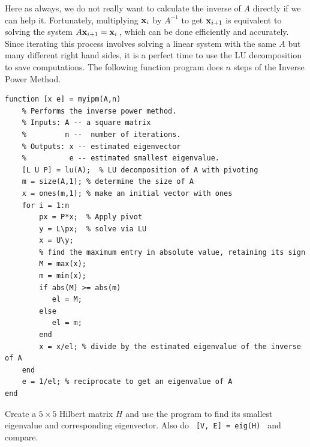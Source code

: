 Here as always, we do not really want to calculate the
inverse of $A$ directly if we can help it. Fortunately, multiplying
$\mathbf{x}_i$ by $A^{-1}$ to get $\mathbf{x}_{i+1}$ is equivalent to solving the system
$    A \mathbf{x}_{i+1} = \mathbf{x}_i\, $,
which can be done efficiently and accurately. Since iterating this process involves
solving a linear system with the same $A$ but many different right hand
sides, it is a perfect time to use the LU decomposition to save computations.
The following function program does $n$ steps of the Inverse Power Method.
\begin{lstlisting}
function [x e] = myipm(A,n)
    % Performs the inverse power method.
    % Inputs: A -- a square matrix   
    %         n --  number of iterations.
    % Outputs: x -- estimated eigenvector
    %          e -- estimated smallest eigenvalue. 
    [L U P] = lu(A);  % LU decomposition of A with pivoting
    m = size(A,1); % determine the size of A
    x = ones(m,1); % make an initial vector with ones
    for i = 1:n
        px = P*x;  % Apply pivot
        y = L\px;  % solve via LU
        x = U\y;
        % find the maximum entry in absolute value, retaining its sign
        M = max(x);  
        m = min(x);
        if abs(M) >= abs(m)
           el = M;
        else
           el = m;
        end
        x = x/el; % divide by the estimated eigenvalue of the inverse of A
    end
    e = 1/el; % reciprocate to get an eigenvalue of A
end
\end{lstlisting}
Create a $5 \times 5$ Hilbert matrix $H$ and use the program to find its smallest eigenvalue and corresponding eigenvector.
Also do \verb& [V, E] = eig(H) & and compare. 



